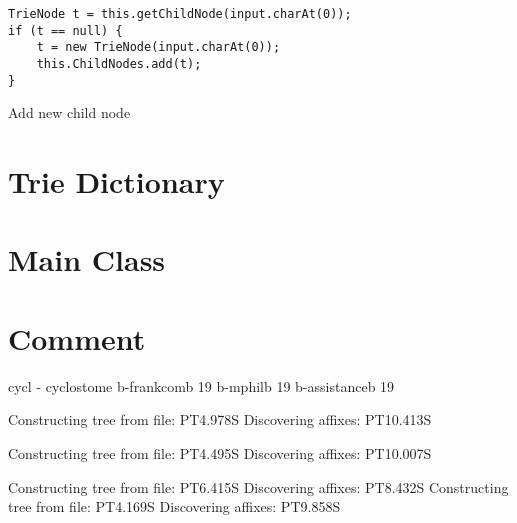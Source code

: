 \documentclass[]{article}
\begin{document}
\begin{listing}[ht]
	\begin{verbatim}
TrieNode t = this.getChildNode(input.charAt(0));
if (t == null) {
	t = new TrieNode(input.charAt(0));
	this.ChildNodes.add(t);
}
	\end{verbatim}
	\caption{Add new child node}
\end{listing}

\section{Trie Dictionary}

\section{Main Class}

\section{Comment}
cycl - cyclostome
b-frankcomb 19
b-mphilb 19
b-assistanceb 19

Constructing tree from file: PT4.978S
Discovering affixes: PT10.413S


Constructing tree from file: PT4.495S
Discovering affixes: PT10.007S


Constructing tree from file: PT6.415S
Discovering affixes: PT8.432S
Constructing tree from file: PT4.169S
Discovering affixes: PT9.858S
\end{document}
